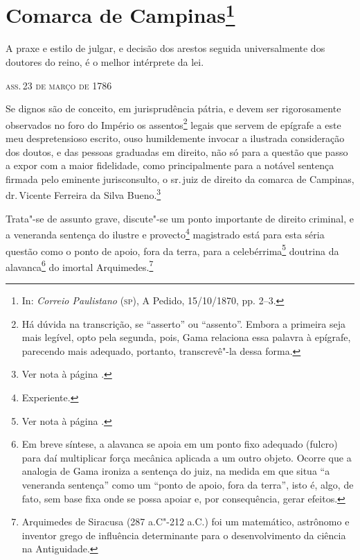 \chapter{Comarca de Campinas\footnote[*]{In: \emph{Correio
  Paulistano} (\textsc{sp}), A Pedido, 15/10/1870, pp. 2--3.}}


\setcounter{footnote}{-1}
\epigraph{A praxe e estilo de julgar, e decisão dos arestos\footnotemark{} seguida universalmente dos doutores do reino, é o melhor
intérprete da lei.}{\textsc{ass.\,23 de março de 1786\footnotemark}}

\setcounter{footnote}{1}
  \setcounter{footnote}{2}

\noindent{}Se dignos são de conceito, em jurisprudência pátria, e devem ser
rigorosamente observados no foro do Império os assentos\footnote{Há
  dúvida na transcrição, se ``asserto'' ou ``assento''. Embora a primeira
  seja mais legível, opto pela segunda, pois, Gama relaciona essa
  palavra à epígrafe, parecendo mais adequado, portanto, transcrevê"-la
  dessa forma.} legais que servem de epígrafe a este meu
despretensioso escrito, ouso humildemente invocar a ilustrada
consideração dos doutos, e das pessoas graduadas em direito, não só para
a questão que passo a expor com a maior fidelidade, como principalmente
para a notável sentença firmada pelo eminente jurisconsulto, o sr.\,juiz
de direito da comarca de Campinas, dr.\,Vicente Ferreira da Silva
Bueno.\footnote{Ver nota à página \pageref{bueno}.}

Trata"-se de assunto grave, discute"-se um ponto importante de direito
criminal, e a veneranda sentença do ilustre e provecto\footnote{
  Experiente.} magistrado está para esta séria questão como o ponto de
apoio, fora da terra, para a celebérrima\footnote{Ver nota à página \pageref{celebre}.} doutrina da alavanca\footnote{
  Em breve síntese, a alavanca se apoia em um ponto fixo adequado
  (fulcro) para daí multiplicar força mecânica aplicada a um outro
  objeto. Ocorre que a analogia de Gama ironiza a sentença do juiz, na
  medida em que situa ``a veneranda sentença'' como um ``ponto de apoio,
  fora da terra'', isto é, algo, de fato, sem base fixa onde se possa
  apoiar e, por consequência, gerar efeitos.} do imortal
Arquimedes.\footnote{Arquimedes de Siracusa (287 a.C"-212 a.C.) foi um
  matemático, astrônomo e inventor grego de influência determinante para
  o desenvolvimento da ciência na Antiguidade.}

